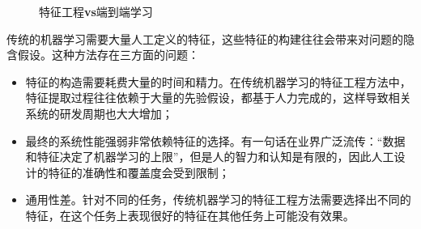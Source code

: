     \begin{figure}[htp]
    \centering
 \vfill
\caption{特征工程{\small\sffamily\bfseries{vs}}端到端学习}
\label{fig:5-2}
\end {figure}

\parinterval 传统的机器学习需要大量人工定义的特征，这些特征的构建往往会带来对问题的隐含假设。这种方法存在三方面的问题：

\begin{itemize}
\vspace{0.5em}
\item 特征的构造需要耗费大量的时间和精力。在传统机器学习的特征工程方法中，特征提取过程往往依赖于大量的先验假设，都基于人力完成的，这样导致相关系统的研发周期也大大增加；
\vspace{0.5em}
\item 最终的系统性能强弱非常依赖特征的选择。有一句话在业界广泛流传：``数据和特征决定了机器学习的上限''，但是人的智力和认知是有限的，因此人工设计的特征的准确性和覆盖度会受到限制；
\vspace{0.5em}
\item 通用性差。针对不同的任务，传统机器学习的特征工程方法需要选择出不同的特征，在这个任务上表现很好的特征在其他任务上可能没有效果。
\vspace{0.5em}
\end{itemize}


